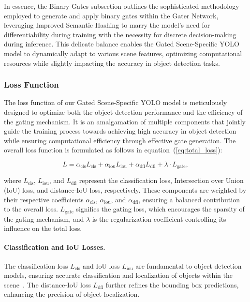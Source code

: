 In essence, the Binary Gates subsection outlines the sophisticated methodology employed to generate and apply binary gates within the Gater Network, leveraging Improved Semantic Hashing to marry the model's need for differentiability during training with the necessity for discrete decision-making during inference. This delicate balance enables the Gated Scene-Specific YOLO model to dynamically adapt to various scene features, optimizing computational resources while slightly impacting the accuracy in object detection tasks.

\subsubsection{Loss Function}
The loss function of our Gated Scene-Specific YOLO model is meticulously designed to optimize both the object detection performance and the efficiency of the gating mechanism. It is an amalgamation of multiple components that jointly guide the training process towards achieving high accuracy in object detection while ensuring computational efficiency through effective gate generation. The overall loss function is formulated as follows in equation~(\ref{eq:total_loss}):

\begin{equation}
L = \alpha_{\text{cls}} L_{\text{cls}} + \alpha_{\text{iou}} L_{\text{iou}} + \alpha_{\text{dfl}} L_{\text{dfl}} + \lambda \cdot L_{\text{gate}},
\label{eq:total_loss}
\end{equation}

where \(L_{\text{cls}}\), \(L_{\text{iou}}\), and \(L_{\text{dfl}}\) represent the classification loss, Intersection over Union (IoU) loss, and distance-IoU loss, respectively. These components are weighted by their respective coefficients \(\alpha_{\text{cls}}\), \(\alpha_{\text{iou}}\), and \(\alpha_{\text{dfl}}\), ensuring a balanced contribution to the overall loss. \(L_{\text{gate}}\) signifies the gating loss, which encourages the sparsity of the gating mechanism, and \(\lambda\) is the regularization coefficient controlling its influence on the total loss.

\paragraph{Classification and IoU Losses.} The classification loss \(L_{\text{cls}}\) and IoU loss \(L_{\text{iou}}\) are fundamental to object detection models, ensuring accurate classification and localization of objects within the scene~\cite{li2023yolov6,li2022yolov6}. The distance-IoU loss \(L_{\text{dfl}}\) further refines the bounding box predictions, enhancing the precision of object localization.

